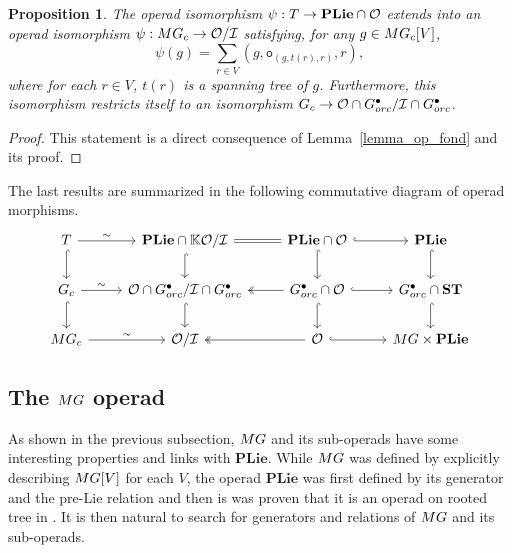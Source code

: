 \documentclass[11pt]{article}
\newtheorem{prop}[theo]{Proposition}
\theoremstyle{definition}
\numberwithin{equation}{section}
\newcommand{\spe}[1]{\normalfont{\textsc{#1}}}
\newcommand{\op}[1]{\mathbf{#1}}
\newcommand{\K}{\mathbb{K}}
\newcommand{\point}[1]{#1^{\bullet}}
\newcommand{\ori}{\texttt{o}}
\newcommand{\T}{\spe{T}}
\newcommand{\G}{\spe{G}}
\newcommand{\MG}{\spe{MG}}
\newcommand{\Operad}{\mathcal{O}}
\newcommand{\PLie}{\op{PLie}}
\newcommand{\ST}{\op{ST}}
\begin{document}
\begin{prop}
    The operad isomorphism $\psi: \T \to \PLie\cap\Operad$ extends into an operad isomorphism 
    $\psi: \MG_c \to \Operad/\mathcal{I}$ satisfying,
    for any $g \in \MG_c[V]$,
    \begin{equation}
        \psi(g) = \sum_{r\in V} (g,\ori_{(g,t(r),r)}, r),
    \end{equation}
    where for each $r\in V$, $t(r)$ is a spanning tree of $g$. Furthermore, this isomorphism restricts 
    itself to an isomorphism  $\G_c \to \Operad\cap\point{\G_{orc}}/\mathcal{I}\cap\point{\G_{orc}}$.
\end{prop}

\begin{proof}
    This statement is a direct consequence of Lemma~\ref{lemma_op_fond} and its proof.
\end{proof}

The last results are summarized in the following commutative diagram of operad morphisms.
\begin{equation}
    \begin{tikzcd}
        \T \arrow[r, "\sim"] \arrow[d, hook]
        & \PLie\cap\K\Operad/\mathcal{I} \arrow[r, equal] \arrow[d, hook]
        & \PLie\cap\Operad \arrow[d,hook] \arrow[r, hook]
        & \PLie \arrow[d,hook]\\
        \G_c \arrow[r, "\sim"] \arrow[d, hook]
        & \Operad\cap\point{\G}_{orc}/\mathcal{I}\cap\point{\G_{orc}} \arrow[d, hook]
        & \point{\G}_{orc}\cap\Operad \arrow[l, two heads] \arrow[r, hook] \arrow[d, hook]
        & \point{\G}_{orc}\cap\ST \arrow[d, hook] \\
        \MG_c \arrow[r, "\sim"]
        & \Operad/\mathcal{I}
        & \Operad \arrow[l, two heads] \arrow[r, hook]
        & \MG\times\PLie
    \end{tikzcd}
\end{equation}





\subsection{The \texorpdfstring{$\MG$}{MG} operad}
As shown in the previous subsection, $\MG$ and its sub-operads have some interesting properties and links 
with  $\PLie$. While $\MG$ was defined by explicitly describing $\MG[V]$ for each $V$, the operad $\PLie$ 
was first defined by its generator and the pre-Lie relation and then is was proven that it is an operad on 
rooted tree in \cite{CL01}. It is then natural to search for generators and relations of $\MG$ and its 
sub-operads. 
\end{document}
